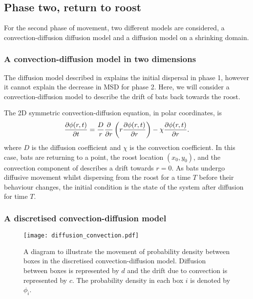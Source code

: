 
\subsection{Phase two, return to roost}

For the second phase of movement, two different models are considered, a convection-diffusion diffusion model and a diffusion model on a shrinking domain.

\subsubsection{A convection-diffusion model in two dimensions}

The diffusion model described in  explains the initial dispersal in phase 1, however it cannot explain the decrease in MSD for phase 2. Here, we will consider a convection-diffusion model to describe the drift of bats back towards the roost.

The 2D symmetric convection-diffusion equation, in polar coordinates, is
%
\begin{equation}
  \frac{\partial \phi(r,t)}{\partial t} = \frac{D}{r} \frac{\partial }{\partial r}\left(r \frac{\partial \phi(r,t)}{\partial r} \right) - \chi \frac{\partial \phi(r,t)}{\partial r}.
  \label{eqn:convection}
\end{equation}
%
where $D$ is the diffusion coefficient and $\chi$ is the convection coefficient. In this case, bats are returning to a point, the roost location $(x_0,y_0)$, and the convection component of  describes a drift towards $r=0$. As bats undergo diffusive movement whilst dispersing from the roost for a time $T$ before their behaviour changes, the initial condition is the state of the system after diffusion for time $T$.

\subsubsection{A discretised convection-diffusion model}


 \begin{figure} [ht]
     \centering
         \texttt{[image: diffusion\_convection.pdf]}
         \caption{A diagram to illustrate the movement of probability density between boxes in the discretised convection-diffusion model. Diffusion between boxes is represented by $d$ and the drift due to convection is represented by $c$. The probability density in each box $i$ is denoted by $\phi_i$.}
     \label{fig:convection_diffusion_diag}
 \end{figure}

